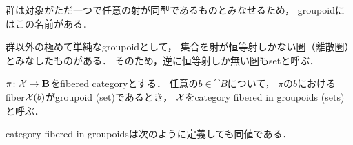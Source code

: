     \begin{Remark}
        群は対象がただ一つで任意の射が同型であるものとみなせるため，
        groupoidにはこの名前がある．

        群以外の極めて単純なgroupoidとして，
        集合を射が恒等射しかない圏（離散圏）とみなしたものがある．
        そのため，逆に恒等射しか無い圏もsetと呼ぶ．
    \end{Remark}

    \begin{Def}
        $\pi \colon \mathcal{X} \to \mathbf{B}$をfibered categoryとする．
        任意の$b \in \cat{B}$について，
        $\pi$の$b$におけるfiber$\mathcal{X}(b)$がgroupoid (set)であるとき，
        $\mathcal{X}$をcategory fibered in groupoids (sets)と呼ぶ．
    \end{Def}
    category fibered in groupoidsは次のように定義しても同値である．

